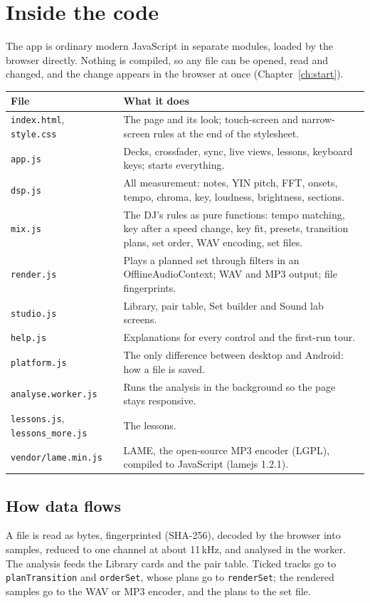 \chapter{Inside the code}\label{ch:code}

The app is ordinary modern JavaScript in separate modules, loaded by the browser directly. Nothing is compiled, so any file can be opened, read and changed, and the change appears in the browser at once (Chapter~\ref{ch:start}).

\begin{tabularx}{\linewidth}{@{}lX@{}}
\toprule
File & What it does \\
\midrule
\texttt{index.html}, \texttt{style.css} & The page and its look; touch-screen and narrow-screen rules at the end of the stylesheet. \\
\texttt{app.js} & Decks, crossfader, sync, live views, lessons, keyboard keys; starts everything. \\
\texttt{dsp.js} & All measurement: notes, YIN pitch, FFT, onsets, tempo, chroma, key, loudness, brightness, sections. \\
\texttt{mix.js} & The DJ's rules as pure functions: tempo matching, key after a speed change, key fit, presets, transition plans, set order, WAV encoding, set files. \\
\texttt{render.js} & Plays a planned set through filters in an OfflineAudioContext; WAV and MP3 output; file fingerprints. \\
\texttt{studio.js} & Library, pair table, Set builder and Sound lab screens. \\
\texttt{help.js} & Explanations for every control and the first-run tour. \\
\texttt{platform.js} & The only difference between desktop and Android: how a file is saved. \\
\texttt{analyse.worker.js} & Runs the analysis in the background so the page stays responsive. \\
\texttt{lessons.js}, \texttt{lessons\_more.js} & The lessons. \\
\texttt{vendor/lame.min.js} & LAME, the open-source MP3 encoder (LGPL), compiled to JavaScript (lamejs 1.2.1). \\
\bottomrule
\end{tabularx}

\section{How data flows}
A file is read as bytes, fingerprinted (SHA-256), decoded by the browser into samples, reduced to one channel at about 11\,kHz, and analysed in the worker. The analysis feeds the Library cards and the pair table. Ticked tracks go to \texttt{planTransition} and \texttt{orderSet}, whose plans go to \texttt{renderSet}; the rendered samples go to the WAV or MP3 encoder, and the plans to the set file.

